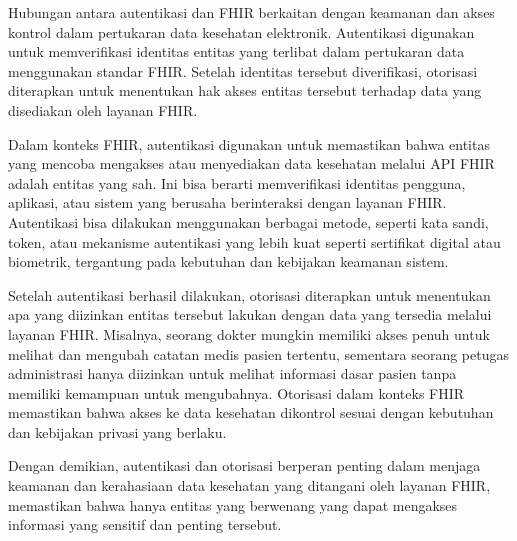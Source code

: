 Hubungan antara autentikasi dan FHIR berkaitan dengan keamanan dan akses kontrol dalam pertukaran data kesehatan elektronik. Autentikasi digunakan untuk memverifikasi identitas entitas yang terlibat dalam pertukaran data menggunakan standar FHIR. Setelah identitas tersebut diverifikasi, otorisasi diterapkan untuk menentukan hak akses entitas tersebut terhadap data yang disediakan oleh layanan FHIR.

Dalam konteks FHIR, autentikasi digunakan untuk memastikan bahwa entitas yang mencoba mengakses atau menyediakan data kesehatan melalui API FHIR adalah entitas yang sah. Ini bisa berarti memverifikasi identitas pengguna, aplikasi, atau sistem yang berusaha berinteraksi dengan layanan FHIR. Autentikasi bisa dilakukan menggunakan berbagai metode, seperti kata sandi, token, atau mekanisme autentikasi yang lebih kuat seperti sertifikat digital atau biometrik, tergantung pada kebutuhan dan kebijakan keamanan sistem.

Setelah autentikasi berhasil dilakukan, otorisasi diterapkan untuk menentukan apa yang diizinkan entitas tersebut lakukan dengan data yang tersedia melalui layanan FHIR. Misalnya, seorang dokter mungkin memiliki akses penuh untuk melihat dan mengubah catatan medis pasien tertentu, sementara seorang petugas administrasi hanya diizinkan untuk melihat informasi dasar pasien tanpa memiliki kemampuan untuk mengubahnya. Otorisasi dalam konteks FHIR memastikan bahwa akses ke data kesehatan dikontrol sesuai dengan kebutuhan dan kebijakan privasi yang berlaku.

Dengan demikian, autentikasi dan otorisasi berperan penting dalam menjaga keamanan dan kerahasiaan data kesehatan yang ditangani oleh layanan FHIR, memastikan bahwa hanya entitas yang berwenang yang dapat mengakses informasi yang sensitif dan penting tersebut.